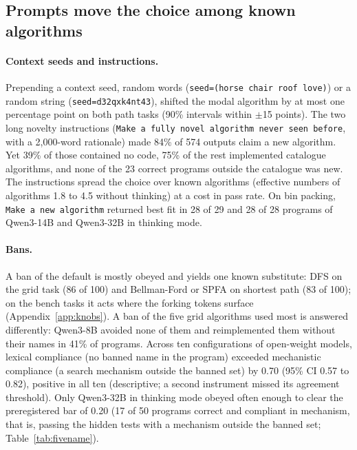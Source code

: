 \documentclass[11pt,letterpaper]{article}
\begin{document}
\subsection{Prompts move the choice among known algorithms}
\label{sec:res-prompts}

\paragraph{Context seeds and instructions.} Prepending a context seed, random words (\texttt{seed=(horse chair roof love)}) or a random string (\texttt{seed=d32qxk4nt43}), shifted the modal algorithm by at most one percentage point on both path tasks (90\% intervals within $\pm$15 points). The two long novelty instructions (\texttt{Make a fully novel algorithm never seen before}, with a 2,000-word rationale) made 84\% of 574 outputs claim a new algorithm. Yet 39\% of those contained no code, 75\% of the rest implemented catalogue algorithms, and none of the 23 correct programs outside the catalogue was new. The instructions spread the choice over known algorithms (effective numbers of algorithms 1.8 to 4.5 without thinking) at a cost in pass rate. On bin packing, \texttt{Make a new algorithm} returned best fit in 28 of 29 and 28 of 28 programs of Qwen3-14B and Qwen3-32B in thinking mode.

\paragraph{Bans.} A ban of the default is mostly obeyed and yields one known substitute: DFS on the grid task (86 of 100) and Bellman-Ford or SPFA on shortest path (83 of 100); on the bench tasks it acts where the forking tokens surface (Appendix~\ref{app:knobs}). A ban of the five grid algorithms used most is answered differently: Qwen3-8B avoided none of them and reimplemented them without their names in 41\% of programs. Across ten configurations of open-weight models, lexical compliance (no banned name in the program) exceeded mechanistic compliance (a search mechanism outside the banned set) by 0.70 (95\% CI 0.57 to 0.82), positive in all ten (descriptive; a second instrument missed its agreement threshold). Only Qwen3-32B in thinking mode obeyed often enough to clear the preregistered bar of 0.20 (17 of 50 programs correct and compliant in mechanism, that is, passing the hidden tests with a mechanism outside the banned set; Table~\ref{tab:fivename}).
\end{document}
